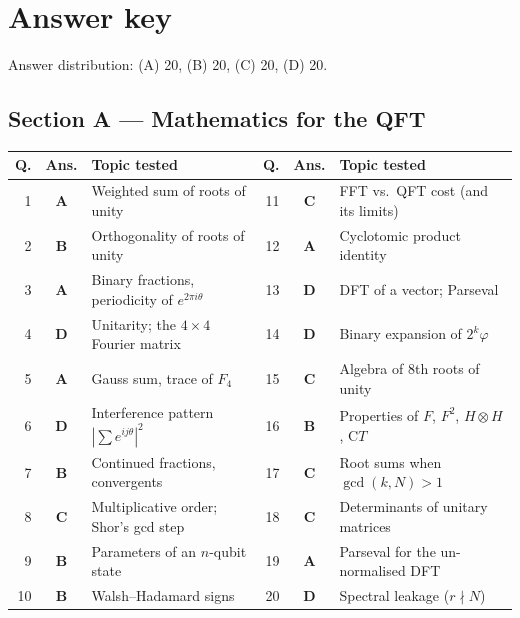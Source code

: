 \documentclass[11pt,a4paper]{article}
\begin{document}
\section*{Answer key}\label{key}
{\small Answer distribution: (A) 20, (B) 20, (C) 20, (D) 20.}

\subsection*{Section A --- Mathematics for the QFT}
{\small\renewcommand{\arraystretch}{1.15}
\begin{tabularx}{\linewidth}{@{}r c L @{\hspace{1em}} r c L@{}}
\toprule
\textbf{Q.} & \textbf{Ans.} & \textbf{Topic tested} & \textbf{Q.} & \textbf{Ans.} & \textbf{Topic tested}\\  & \textbf{A} & Weighted sum of roots of unity & 11 & \textbf{C} & FFT vs.\ QFT cost (and its limits) \\
2 & \textbf{B} & Orthogonality of roots of unity & 12 & \textbf{A} & Cyclotomic product identity \\
3 & \textbf{A} & Binary fractions, periodicity of $e^{2\pi i\theta}$ & 13 & \textbf{D} & DFT of a vector; Parseval \\
4 & \textbf{D} & Unitarity; the $4\times4$ Fourier matrix & 14 & \textbf{D} & Binary expansion of $2^k\varphi$ \\
5 & \textbf{A} & Gauss sum, trace of $F_4$ & 15 & \textbf{C} & Algebra of 8th roots of unity \\
6 & \textbf{D} & Interference pattern $|\sum e^{ij\theta}|^2$ & 16 & \textbf{B} & Properties of $F$, $F^2$, $H\otimes H$, C$T$ \\
7 & \textbf{B} & Continued fractions, convergents & 17 & \textbf{C} & Root sums when $\gcd(k,N)>1$ \\
8 & \textbf{C} & Multiplicative order; Shor's gcd step & 18 & \textbf{C} & Determinants of unitary matrices \\
9 & \textbf{B} & Parameters of an $n$-qubit state & 19 & \textbf{A} & Parseval for the un-normalised DFT \\
10 & \textbf{B} & Walsh--Hadamard signs & 20 & \textbf{D} & Spectral leakage ($r\nmid N$) \\
\bottomrule
\end{tabularx}}

\end{document}
